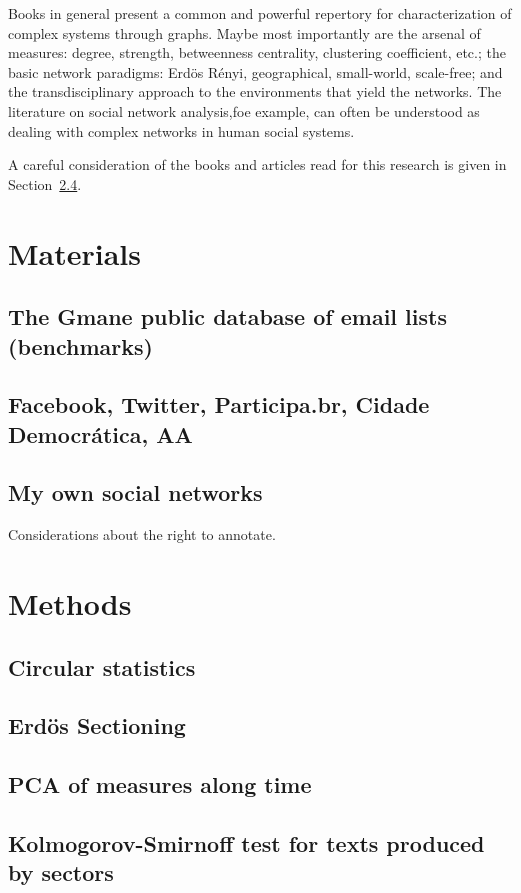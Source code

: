 \documentclass[a4paper,openright,12pt]{report} %
\begin{document}
Books in general present a common and powerful repertory for characterization of complex systems through graphs. Maybe most importantly are the arsenal of measures: degree, strength, betweenness centrality, clustering coefficient, etc.; the basic network paradigms: Erd\"os Rényi, geographical, small-world, scale-free; and the transdisciplinary approach to the environments that yield the networks. The literature on social network analysis,foe example, can often be understood as dealing with complex networks in human social systems.

A careful consideration of the books and articles read for this research
is given in Section~\ref{}.

\chapter{Materials}
\section{The Gmane public database of email lists (benchmarks)}
\section{Facebook, Twitter, Participa.br, Cidade Democrática, AA}
\section{My own social networks}
Considerations about the right to annotate.

\chapter{Methods}
\section{Circular statistics}
\section{Erdös Sectioning}
\section{PCA of measures along time}
\section{Kolmogorov-Smirnoff test for texts produced by sectors}
\end{document}
